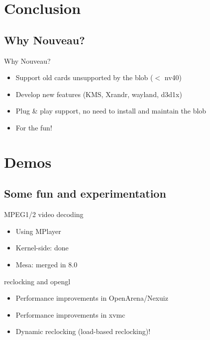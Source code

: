 \documentclass[11pt,english,compress]{beamer}
\begin{document}
\section{Conclusion}
	\subsection*{Why Nouveau?}
		\begin{frame}
			\begin{block}{Why Nouveau?}
				\begin{itemize}
					\item Support old cards unsupported by the blob ($<$ nv40)
					\item Develop new features (KMS, Xrandr, wayland, d3d1x)
					\item Plug \& play support, no need to install and maintain the blob
					\item For the fun!
				\end{itemize}
			\end{block}
		\end{frame}

\section{Demos}
	\subsection*{Some fun and experimentation}
		\begin{frame}
			\begin{block}{MPEG1/2 video decoding}
				\begin{itemize}
					\item Using MPlayer
					\item Kernel-side: done
					\item Mesa: merged in 8.0
				\end{itemize}
			\end{block}

			\begin{block}{reclocking and opengl}
				\begin{itemize}
					\item Performance improvements in OpenArena/Nexuiz
					\item Performance improvements in xvmc
					\item Dynamic reclocking (load-based reclocking)!
				\end{itemize}
			\end{block}
		\end{frame}
\end{document}
